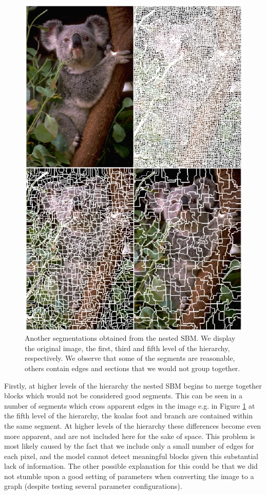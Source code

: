 \documentclass[conference]{IEEEtran}
\begin{document}
\begin{figure}[ht]
    \centering
    \includegraphics[width=\linewidth]{images/hsbm_koala_segmentation.png}
    \caption{Another segmentations obtained from the nested SBM. We display the original image, the first, third and fifth level of the hierarchy, respectively. We observe that some of the segments are reasonable, others contain edges and sections that we would not group together.}
    \label{fig:sbm_hseg_koala}
\end{figure}

Firstly, at higher levels of the hierarchy the nested SBM begins to merge together blocks which would not be considered good segments. This can be seen in a number of segments which cross apparent edges in the image e.g. in Figure \ref{fig:sbm_hseg_koala} at the fifth level of the hierarchy, the koalas foot and branch are contained within the same segment. At higher levels of the hierarchy these differences become even more apparent, and are not included here for the sake of space. This problem is most likely caused by the fact that we include only a small number of edges for each pixel, and the model cannot detect meaningful blocks given this substantial lack of information. The other possible explanation for this could be that we did not stumble upon a good setting of parameters when converting the image to a graph (despite testing several parameter configurations).
\end{document}
